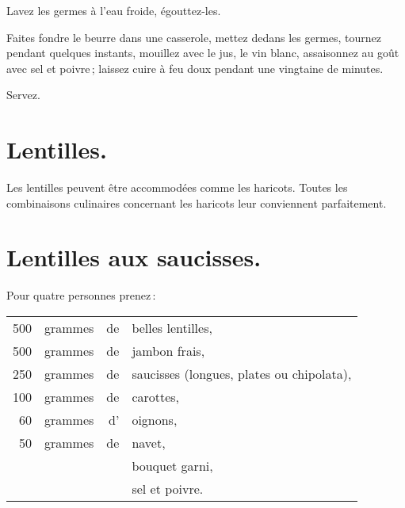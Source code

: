 Lavez les germes à l'eau froide, égouttez-les.

Faites fondre le beurre dans une casserole, mettez dedans les germes, tournez
pendant quelques instants, mouillez avec le jus, le vin blanc, assaisonnez au
goût avec sel et poivre ; laissez cuire à feu doux pendant une vingtaine de
minutes.

Servez.

\section*{\centering Lentilles.}
{}

Les lentilles peuvent être accommodées comme les haricots. Toutes les
combinaisons culinaires concernant les haricots leur conviennent parfaitement.

\section*{\centering Lentilles aux saucisses.}
{}

Pour quatre personnes prenez :

\footnotesize
\begin{longtable}{rrrp{16em}}
    500 & grammes & de & belles lentilles,                                                                \\
    500 & grammes & de & jambon frais,                                                                    \\
    250 & grammes & de & saucisses (longues, plates ou chipolata),                                        \\
    100 & grammes & de & carottes,                                                                        \\
     60 & grammes & d' & oignons,                                                                         \\
     50 & grammes & de & navet,                                                                           \\
        &         &    & bouquet garni,                                                                   \\
        &         &    & sel et poivre.                                                                   \\
\end{longtable}
\normalsize

